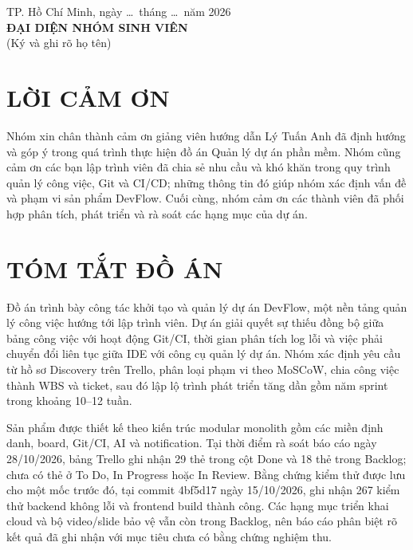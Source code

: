 \documentclass[12pt,a4paper]{report}
\begin{document}
\vspace{1cm}
\begin{flushright}
TP. Hồ Chí Minh, ngày \ldots\ tháng \ldots\ năm 2026\\[0.7cm]
\textbf{ĐẠI DIỆN NHÓM SINH VIÊN}\\[1.5cm]
(Ký và ghi rõ họ tên)
\end{flushright}

\chapter*{LỜI CẢM ƠN}
Nhóm xin chân thành cảm ơn giảng viên hướng dẫn Lý Tuấn Anh đã định hướng và góp ý trong quá trình thực hiện đồ án Quản lý dự án phần mềm. Nhóm cũng cảm ơn các bạn lập trình viên đã chia sẻ nhu cầu và khó khăn trong quy trình quản lý công việc, Git và CI/CD; những thông tin đó giúp nhóm xác định vấn đề và phạm vi sản phẩm DevFlow. Cuối cùng, nhóm cảm ơn các thành viên đã phối hợp phân tích, phát triển và rà soát các hạng mục của dự án.

\chapter*{TÓM TẮT ĐỒ ÁN}
Đồ án trình bày công tác khởi tạo và quản lý dự án DevFlow, một nền tảng quản lý công việc hướng tới lập trình viên. Dự án giải quyết sự thiếu đồng bộ giữa bảng công việc với hoạt động Git/CI, thời gian phân tích log lỗi và việc phải chuyển đổi liên tục giữa IDE với công cụ quản lý dự án. Nhóm xác định yêu cầu từ hồ sơ Discovery trên Trello, phân loại phạm vi theo MoSCoW, chia công việc thành WBS và ticket, sau đó lập lộ trình phát triển tăng dần gồm năm sprint trong khoảng 10–12 tuần.

Sản phẩm được thiết kế theo kiến trúc modular monolith gồm các miền định danh, board, Git/CI, AI và notification. Tại thời điểm rà soát báo cáo ngày 28/10/2026, bảng Trello ghi nhận 29 thẻ trong cột Done và 18 thẻ trong Backlog; chưa có thẻ ở To Do, In Progress hoặc In Review. Bằng chứng kiểm thử được lưu cho một mốc trước đó, tại commit 4bf5d17 ngày 15/10/2026, ghi nhận 267 kiểm thử backend không lỗi và frontend build thành công. Các hạng mục triển khai cloud và bộ video/slide bảo vệ vẫn còn trong Backlog, nên báo cáo phân biệt rõ kết quả đã ghi nhận với mục tiêu chưa có bằng chứng nghiệm thu.
\end{document}
